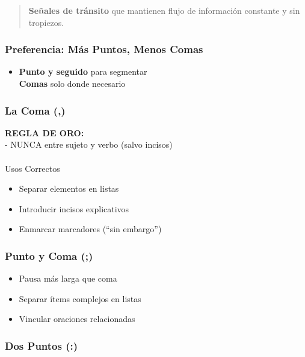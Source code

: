 \documentclass[
  11pt,
]{beaner}
\makeatletter
\let\oldparagraph\paragraph
\renewcommand{\paragraph}{
    \@ifstar
      \xxxParagraphStar
      \xxxParagraphNoStar
  }
\newcommand{\xxxParagraphStar}[1]{\oldparagraph*{#1}\mbox{}}
\newcommand{\xxxParagraphNoStar}[1]{\oldparagraph{#1}\mbox{}}
\providecommand{\tightlist}{%
  \setlength{\itemsep}{0pt}\setlength{\parskip}{0pt}}
\makeatother
\begin{document}
\begin{quote}
\textbf{Señales de tránsito} que mantienen flujo de información
constante y sin tropiezos.
\end{quote}

\subsubsection{Preferencia: Más Puntos, Menos
Comas}\label{preferencia-muxe1s-puntos-menos-comas}

\begin{itemize}
\tightlist
\item
  \textbf{Punto y seguido} para segmentar\\
  \textbf{Comas} solo donde necesario
\end{itemize}

\subsubsection{La Coma (,)}\label{la-coma}

\textbf{REGLA DE ORO:}\\
- NUNCA entre sujeto y verbo (salvo incisos)

\paragraph{Usos Correctos}\label{usos-correctos}

\begin{itemize}
\tightlist
\item
  Separar elementos en listas
\item
  Introducir incisos explicativos
\item
  Enmarcar marcadores (``sin embargo'')
\end{itemize}

\subsubsection{Punto y Coma (;)}\label{punto-y-coma}

\begin{itemize}
\tightlist
\item
  Pausa más larga que coma
\item
  Separar ítems complejos en listas
\item
  Vincular oraciones relacionadas
\end{itemize}

\subsubsection{Dos Puntos (:)}\label{dos-puntos}
\end{document}
